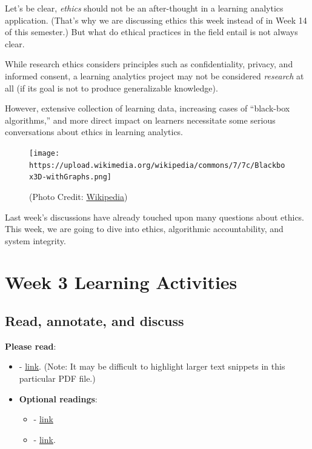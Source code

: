 \documentclass[
]{book}
\providecommand{\tightlist}{%
  \setlength{\itemsep}{0pt}\setlength{\parskip}{0pt}}
\begin{document}
Let's be clear, \emph{ethics} should not be an after-thought in a learning analytics application. (That's why we are discussing ethics this week instead of in Week 14 of this semester.) But what do ethical practices in the field entail is not always clear.

While research ethics considers principles such as confidentiality, privacy, and informed consent, a learning analytics project may not be considered \emph{research} at all (if its goal is not to produce generalizable knowledge).

However, extensive collection of learning data, increasing cases of ``black-box algorithms,'' and more direct impact on learners necessitate some serious conversations about ethics in learning analytics.

\begin{figure}
\centering
\texttt{[image: https://upload.wikimedia.org/wikipedia/commons/7/7c/Blackbox3D-withGraphs.png]}
\caption{(Photo Credit: \href{https://en.wikipedia.org/wiki/Black_box}{Wikipedia})}
\end{figure}

Last week's discussions have already touched upon many questions about ethics. This week, we are going to dive into ethics, algorithmic accountability, and system integrity.

\hypertarget{week-3-learning-activities}{%
\section{Week 3 Learning Activities}\label{week-3-learning-activities}}

\hypertarget{read-annotate-and-discuss}{%
\subsection{Read, annotate, and discuss}\label{read-annotate-and-discuss}}

\textbf{Please read}:

\begin{itemize}
\tightlist
\item
  \citet{prinsloo2017ethics} - \href{https://solaresearch.org/wp-content/uploads/2017/05/chapter4.pdf}{link}. (Note: It may be difficult to highlight larger text snippets in this particular PDF file.)
\item
  \textbf{Optional readings}:

  \begin{itemize}
  \tightlist
  \item
    \citet{kitto2019practical} - \href{http://sjgknight.com/finding-knowledge/wp-content/uploads/2019/08/EthicalLA-accepted_oro.pdf}{link}
  \item
    \citet{chen2019valuesensitive} - \href{https://arxiv.org/pdf/1812.08335.pdf}{link}.
  \end{itemize}
\end{itemize}
\end{document}
